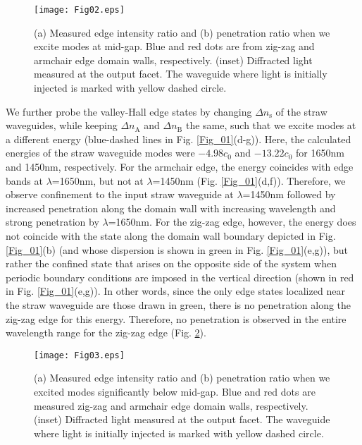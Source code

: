 \documentclass[prl,twocolumn,showpacs,amsmath,amssymb,superscriptaddress]{revtex4-1}
\begin{document}
\begin{figure}[htbp]
	\centering
	\texttt{[image: Fig02.eps]}
	\caption{(a) Measured edge intensity ratio and (b) penetration ratio when we excite modes at mid-gap. Blue and red dots are from zig-zag and armchair edge domain walls, respectively. (inset) Diffracted light measured at the output facet. The waveguide where light is initially injected is marked with yellow dashed circle.}
	\label{Fig_02}
\end{figure}

We further probe the valley-Hall edge states by changing $\Delta n_{\textrm{s}}$ of the straw waveguides, while keeping $\Delta n_{\textrm{A}}$ and $\Delta n_{\textrm{B}}$ the same, such that we excite modes at a different energy (blue-dashed lines in Fig. \ref{Fig_01}(d-g)).
Here, the calculated energies of the straw waveguide modes were $-4.98 c_{0}$ and $-13.22 c_{0}$ for 1650nm and 1450nm, respectively.
For the armchair edge, the energy coincides with edge bands at $\lambda$=1650nm, but not at $\lambda$=1450nm (Fig. \ref{Fig_01}(d,f)).  
Therefore, we observe confinement to the input straw waveguide at $\lambda$=1450nm followed by increased penetration along the domain wall with increasing wavelength and strong penetration by $\lambda$=1650nm.  For the zig-zag edge, however, the energy does not coincide with the state along the domain wall boundary depicted in Fig. \ref{Fig_01}(b) (and whose dispersion is shown in green in Fig. \ref{Fig_01}(e,g)), but rather the confined state that arises on the opposite side of the system when periodic boundary conditions are imposed in the vertical direction (shown in red in Fig. \ref{Fig_01}(e,g)).  In other words, since the only edge states localized near the straw waveguide are those drawn in green, there is no penetration along the zig-zag edge for this energy.  Therefore, no penetration is observed in the entire wavelength range for the zig-zag edge (Fig. \ref{Fig_03}).   

\begin{figure}[htbp]
	\centering
	\texttt{[image: Fig03.eps]}
	\caption{(a) Measured edge intensity ratio and (b) penetration ratio when we excited modes significantly below mid-gap. Blue and red dots are measured zig-zag and armchair edge domain walls, respectively. (inset) Diffracted light measured at the output facet. The waveguide where light is initially injected is marked with yellow dashed circle.}
	\label{Fig_03}
\end{figure}
\end{document}
